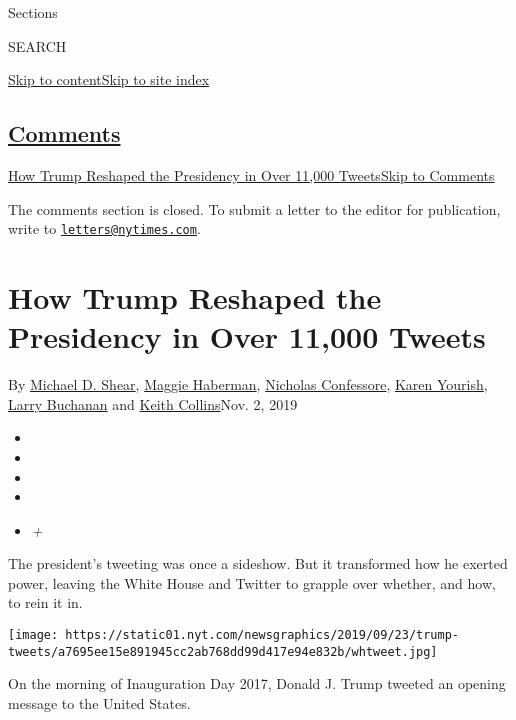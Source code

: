 Sections

SEARCH

\protect\hyperlink{site-content}{Skip to
content}\protect\hyperlink{site-index}{Skip to site index}

\hypertarget{comments}{%
\subsection{\texorpdfstring{\protect\hyperlink{commentsContainer}{Comments}}{Comments}}\label{comments}}

\href{}{How Trump Reshaped the Presidency in Over 11,000
Tweets}\href{}{Skip to Comments}

The comments section is closed. To submit a letter to the editor for
publication, write to
\href{mailto:letters@nytimes.com}{\nolinkurl{letters@nytimes.com}}.

\hypertarget{how-trump-reshaped-the-presidency-in-over-11000-tweets}{%
\section{How Trump Reshaped the Presidency in Over 11,000
Tweets}\label{how-trump-reshaped-the-presidency-in-over-11000-tweets}}

By \href{https://www.nytimes.com/by/michael-d-shear}{Michael D. Shear},
\href{https://www.nytimes.com/by/maggie-haberman}{Maggie Haberman},
\href{https://www.nytimes.com/by/nicholas-confessore}{Nicholas
Confessore}, \href{https://www.nytimes.com/by/karen-yourish}{Karen
Yourish}, \href{https://www.nytimes.com/by/larry-buchanan}{Larry
Buchanan} and \href{https://www.nytimes.com/by/keith-collins}{Keith
Collins}Nov. 2, 2019

\begin{itemize}
\item
\item
\item
\item
\item
  \emph{+}
\end{itemize}

The president's tweeting was once a sideshow. But it transformed how he
exerted power, leaving the White House and Twitter to grapple over
whether, and how, to rein it in.

\texttt{[image: https://static01.nyt.com/newsgraphics/2019/09/23/trump-tweets/a7695ee15e891945cc2ab768dd99d417e94e832b/whtweet.jpg]}

On the morning of Inauguration Day 2017, Donald J. Trump tweeted an
opening message to the United States.

